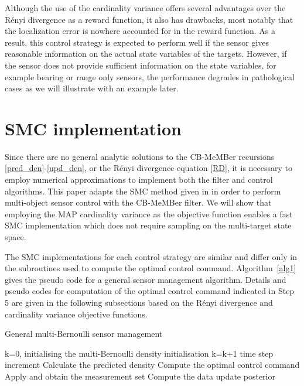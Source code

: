 \documentclass[twocolumn]{autart}
\begin{document}
Although the use of the cardinality variance offers several advantages over
the R\'{e}nyi divergence as a reward function, it also has drawbacks, most
notably that the localization error is nowhere accounted for in the reward
function. As a result, this control strategy is expected to perform well if
the sensor gives reasonable information on the actual state variables of the
targets. However, if the sensor does not provide sufficient information on
the state variables, for example bearing or range only sensors, the
performance degrades in pathological cases as we will illustrate with an
example later.

\section{SMC implementation}

Since there are no general analytic solutions to the CB-MeMBer recursions \eqref{pred_den}-\eqref{upd_den}, or the R\'{e}nyi divergence equation \eqref{RD}, it is necessary to employ numerical approximations to implement
both the filter and control algorithms. This paper adapts the SMC method
given in \cite{RAG04} in order to perform multi-object sensor control with
the CB-MeMBer filter. We will show that employing the MAP cardinality variance as
the objective function enables a fast SMC implementation which does not require
sampling on the multi-target state space.

The SMC implementations for each control strategy are similar and differ only in the subroutines used to compute the optimal control command. Algorithm~\ref{alg1} gives the pseudo code for a general sensor management algorithm. Details and pseudo codes for computation of the optimal control command indicated in Step 5 are given in the following subsections based on the  R\'enyi divergence and cardinality variance objective functions.
\renewcommand{\algorithmicrequire}{\textbf{Inputs:}} \renewcommand{\algorithmicensure}{\textbf{Outputs:}}
\begin{algorithm}[htb]
\caption{General multi-Bernoulli sensor management}
\label{alg1}
\begin{algorithmic}[1]
    \State k=0, initialising the multi-Bernoulli density  \Comment initialisation
    \Repeat
    \State k=k+1 \Comment time step increment
    \State Calculate the predicted density 
     \Statex \quad \; 
    \State Compute the optimal control command 
    \State Apply  and obtain the measurement set 
    \State Compute the data update posterior
    \Statex \quad \;
\end{algorithmic}
\end{algorithm}
\end{document}
